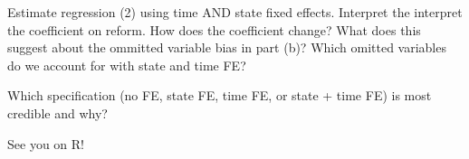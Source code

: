 \documentclass[11pt,xcolor=table]{beamer}
\begin{document}
\begin{frame}

Estimate regression (2) using time AND state fixed effects. Interpret the interpret the coefficient on reform. How does the coefficient change? What does this suggest about the ommitted variable bias in part (b)? Which omitted variables do we account for with state and time FE?

Which specification (no FE, state FE, time FE, or state + time FE) is most credible and why?
\end{frame}

\begin{frame}{See you on R!}

\end{frame}












 
\end{document}
